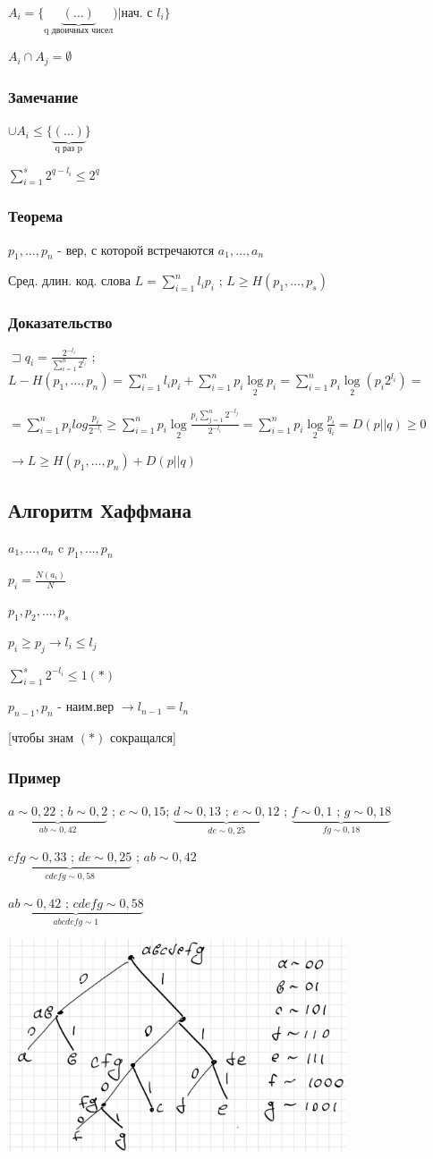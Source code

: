 \documentclass[12pt]{article}
\begin{document}
$A_i=\{\underbrace{(\dots)}_{\text{q двоичных чисел}})|$нач. с $l_i\}$

$A_i\cap A_j=\emptyset$

\subsubsection{Замечание}
$\cup A_i \leq \{ \underbrace{(\dots)}_{\text{q раз p}}\}$

$\sum\limits_{i=1}^s 2^{q-l_i} \leq 2^q$
\subsubsection{Теорема}
$p_1,\dots, p_n$ - вер, с которой встречаются $a_1, \dots, a_n$

Сред. длин. код. слова $L = \sum\limits_{i=1}^n l_ip_i $ ; $L \geq H(p_1, \dots, p_s)$
\subsubsection{Доказательство}
$\sqsupset q_i=\frac{2^{-l_i}}{\sum\limits_{i=1}^n2^{l_i}}$ ; $L-H(p_1,\dots, p_n)=\sum\limits_{i=1}^nl_ip_i+\sum\limits_{i=1}^np_i\log\limits_2{p_i}=\sum\limits_{i=1}^np_i\log\limits_2(p_i2^{l_i})=$

$=\sum\limits_{i=1}^np_ilog{\frac{p_i}{2^{-l_i}}} \geq \sum\limits_{i=1}^np_i\log\limits_2{\frac{p_i\sum\limits_{j=1}^n2^{-l_j}}{2^{-l_i}}}=\sum\limits_{i=1}^np_i\log\limits_2{\frac{p_i}{q_i}}=D(p||q) \geq 0$

$\rightarrow L \geq H(p_1, \dots, p_n) + D(p||q)$
\subsection{Алгоритм Хаффмана}

$a_1, \dots, a_n$ c $p_1, \dots, p_n$

$p_i = \frac{N(a_i)}{N}$

$p_1, p_2, \dots, p_s$

$p_i \geq p_j \rightarrow l_i \leq l_j$

$\sum\limits_{i=1}^s 2^{-l_i} \leq 1 (*)$

$p_{n-1}, p_n$ - наим.вер $\rightarrow l_{n-1} = l_n$

[чтобы знам $(*)$ сокращался]
\subsubsection{Пример}
$\underbrace{a \sim 0,22 \text{ ; }b \sim 0,2}_{ab \sim 0,42}$ ; $c \sim 0,15$; $\underbrace{d \sim 0,13 \text{ ; }e \sim 0,12}_{de \sim 0,25}$ ; $\underbrace{f \sim 0,1\text{ ; } g \sim 0,18 }_{fg \sim 0,18}$

$\underbrace{cfg \sim 0,33 \text{ ; }de \sim 0,25}_{cdefg \sim 0,58}$ ; $ab \sim 0,42$

$\underbrace{ab \sim 0,42 \text{ ; }cdefg \sim 0,58}_{abcdefg \sim 1}$

\includegraphics[width=100mm]{images/tree2.png}
\end{document}
